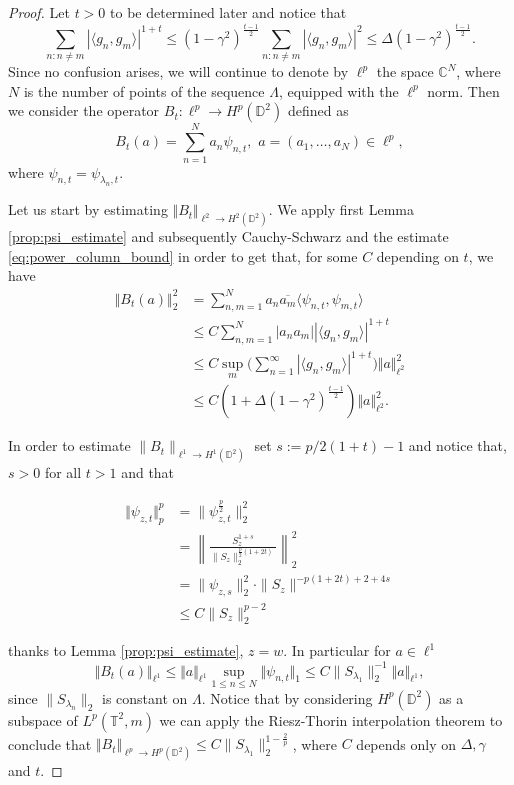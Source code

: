 \documentclass[10pt,a4paper]{amsart}
\begin{document}
\begin{proof}
 Let $t>0$ to be determined later and notice that 
 \begin{equation}\label{eq:power_column_bound}
		\sum_{n:n\neq m} | \langle g_n, g_m \rangle|^{1+t} \leq (1-\gamma^2)^{\frac{t-1}{2}}\sum_{n:n\neq m} | \langle g_n, g_m \rangle|^2 \leq \Delta (1-\gamma^2)^{\frac{t-1}{2}}.  
	\end{equation}
	Since no confusion arises, we will continue to denote by $\ell^p$ the space $\mathbb{C}^N$, where $N$ is the number of points of the sequence $\Lambda$, equipped with the $\ell^p$ norm. 
	Then we consider the operator $B_t:\ell^p \to H^p(\mathbb{D}^2)	$ defined as 
	\[ B_t(a) = \sum_{n=1}^{N} a_n \psi_{n,t}, \,\, a=(a_1,\dots,a_N)\in \ell^p,  \]
where $ \psi_{n,t}= \psi_{\lambda_n,t}.$ 

Let us start by estimating $\Vert B_t\Vert_{\ell^2 \to H^2(\mathbb{D}^2)} $. We apply first Lemma \ref{prop:psi_estimate} and subsequently Cauchy-Schwarz and the estimate \eqref{eq:power_column_bound} in order to get that, for some $C$ depending on $t$, we have 
\begin{align*} \Vert B_t(a)\Vert^2_{2}  & = \sum_{n,m=1}^N a_n \overline{a_m} \langle \psi_{n,t}, \psi_{m,t} \rangle \\
	& \leq C \sum_{n,m=1}^N |a_n a_m| |\langle g_n, g_m \rangle|^{1+t} \\
	& \leq C \sup_{m} \Big( \sum_{n=1}^{\infty} | \langle g_n, g_m \rangle|^{1+t} \Big)  \Vert a\Vert_{\ell^2}^2 \\ 
	& \leq C(1+\Delta (1-\gamma^2)^{\frac{t-1}{2}}) \Vert a\Vert_{\ell^2}^2.
 \end{align*}

 In order to estimate  $\| B_t\|_{\ell^1 \to H^1(\mathbb{D}^2)}$ set $s:=p/2(1+t)-1$ and notice that, $s>0$ for all $t>1$ and that


\begin{equation}
\begin{split}
\label{eq:pnorm_psit}\Vert \psi_{z,t} \Vert_p^p  &=\|\psi_{z, t}^\frac{p}{2}\|^2_2\\
&=\left\|\frac{S_z^{1+s}}{\|S_z\|_2^{\frac{p}{2}(1+2t)}}\right\|_2^2\\
&=\|\psi_{z, s}\|^2_2\cdot\|S_z\|^{-p(1+2t)+2+4s}\\
&\leq C\|S_z\|_2^{p-2}
\end{split}
\end{equation}

thanks to Lemma \ref{prop:psi_estimate}, $z=w$. In particular for $a\in \ell^1$
\[ \Vert B_t(a)\Vert_{\ell^1} \leq \Vert a\Vert_{\ell^1} \sup_{1\leq n \leq N} \Vert \psi_{n,t}\Vert_{1}  \leq C \|S_{\lambda_1}\|^{-1}_2 \Vert a\Vert_{\ell^1},  \]
since $\|S_{\lambda_n}\|_2$ is constant on $\Lambda$. Notice that by considering $H^p(\mathbb{D}^2)$ as a subspace of $L^p(\mathbb{T}^2,m)$ we can apply the Riesz-Thorin interpolation theorem to conclude that $\Vert B_t\Vert_{\ell^p \to H^p(\mathbb{D}^2)} \leq C\|S_{\lambda_1}\|_2^{1-\frac{2}{p}}$, where $C$ depends only on $\Delta, \gamma$ and $t.$   


\end{proof}
\end{document}

